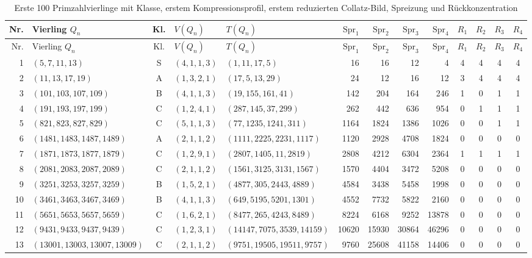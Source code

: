 \begin{longtable}{r l c l l r r r r c c c c}
\caption{Erste 100 Primzahlvierlinge mit Klasse, erstem Kompressionsprofil, erstem reduzierten Collatz-Bild, Spreizung und Rückkonzentration}\label{tab:quad100}\\
\toprule
Nr. & Vierling $Q_n$ & Kl. & $V(Q_n)$ & $T(Q_n)$ & $\mathrm{Spr}_1$ & $\mathrm{Spr}_2$ & $\mathrm{Spr}_3$ & $\mathrm{Spr}_4$ & $R_1$ & $R_2$ & $R_3$ & $R_4$\\
\midrule
\endfirsthead
\toprule
Nr. & Vierling $Q_n$ & Kl. & $V(Q_n)$ & $T(Q_n)$ & $\mathrm{Spr}_1$ & $\mathrm{Spr}_2$ & $\mathrm{Spr}_3$ & $\mathrm{Spr}_4$ & $R_1$ & $R_2$ & $R_3$ & $R_4$\\
\midrule
\endhead
1 & $(5,7,11,13)$ & S & $(4,1,1,3)$ & $(1,11,17,5)$ & 16 & 16 & 12 & 4 & 4 & 4 & 4 & 4\\
2 & $(11,13,17,19)$ & A & $(1,3,2,1)$ & $(17,5,13,29)$ & 24 & 12 & 16 & 12 & 3 & 4 & 4 & 4\\
3 & $(101,103,107,109)$ & B & $(4,1,1,3)$ & $(19,155,161,41)$ & 142 & 204 & 164 & 246 & 1 & 0 & 1 & 1\\
4 & $(191,193,197,199)$ & C & $(1,2,4,1)$ & $(287,145,37,299)$ & 262 & 442 & 636 & 954 & 0 & 1 & 1 & 1\\
5 & $(821,823,827,829)$ & C & $(5,1,1,3)$ & $(77,1235,1241,311)$ & 1164 & 1824 & 1386 & 1026 & 0 & 0 & 1 & 1\\
6 & $(1481,1483,1487,1489)$ & A & $(2,1,1,2)$ & $(1111,2225,2231,1117)$ & 1120 & 2928 & 4708 & 1824 & 0 & 0 & 0 & 0\\
7 & $(1871,1873,1877,1879)$ & C & $(1,2,9,1)$ & $(2807,1405,11,2819)$ & 2808 & 4212 & 6304 & 2364 & 1 & 1 & 1 & 1\\
8 & $(2081,2083,2087,2089)$ & C & $(2,1,1,2)$ & $(1561,3125,3131,1567)$ & 1570 & 4404 & 3472 & 5208 & 0 & 0 & 0 & 0\\
9 & $(3251,3253,3257,3259)$ & B & $(1,5,2,1)$ & $(4877,305,2443,4889)$ & 4584 & 3438 & 5458 & 1998 & 0 & 0 & 0 & 0\\
10 & $(3461,3463,3467,3469)$ & B & $(4,1,1,3)$ & $(649,5195,5201,1301)$ & 4552 & 7732 & 5822 & 2160 & 0 & 0 & 0 & 0\\
11 & $(5651,5653,5657,5659)$ & C & $(1,6,2,1)$ & $(8477,265,4243,8489)$ & 8224 & 6168 & 9252 & 13878 & 0 & 0 & 0 & 0\\
12 & $(9431,9433,9437,9439)$ & C & $(1,2,3,1)$ & $(14147,7075,3539,14159)$ & 10620 & 15930 & 30864 & 46296 & 0 & 0 & 0 & 0\\
13 & $(13001,13003,13007,13009)$ & C & $(2,1,1,2)$ & $(9751,19505,19511,9757)$ & 9760 & 25608 & 41158 & 14406 & 0 & 0 & 0 & 0\\

\end{longtable}
